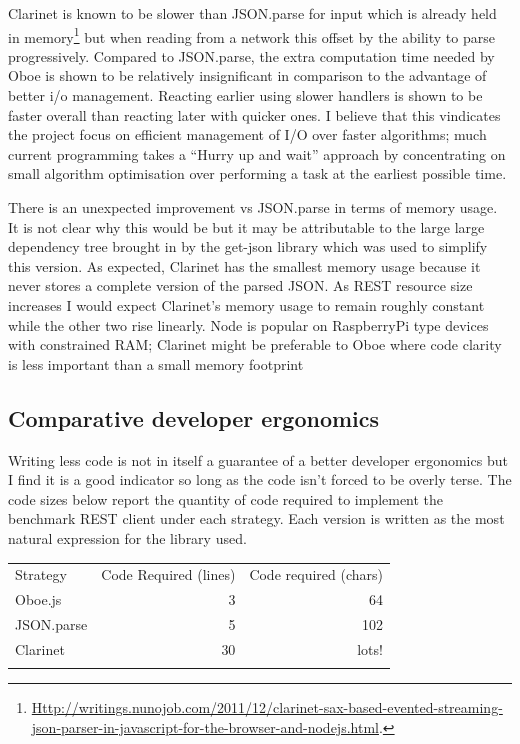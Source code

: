 \documentclass[]{article}
\begin{document}
Clarinet is known to be slower than JSON.parse for input which is
already held in memory\footnote{\href{http://writings.nunojob.com/2011/12/clarinet-sax-based-evented-streaming-json-parser-in-javascript-for-the-browser-and-nodejs.html}{Http://writings.nunojob.com/2011/12/clarinet-sax-based-evented-streaming-json-parser-in-javascript-for-the-browser-and-nodejs.html}.}
but when reading from a network this offset by the ability to parse
progressively. Compared to JSON.parse, the extra computation time needed
by Oboe is shown to be relatively insignificant in comparison to the
advantage of better i/o management. Reacting earlier using slower
handlers is shown to be faster overall than reacting later with quicker
ones. I believe that this vindicates the project focus on efficient
management of I/O over faster algorithms; much current programming takes
a ``Hurry up and wait'' approach by concentrating on small algorithm
optimisation over performing a task at the earliest possible time.

There is an unexpected improvement vs JSON.parse in terms of memory
usage. It is not clear why this would be but it may be attributable to
the large large dependency tree brought in by the get-json library which
was used to simplify this version. As expected, Clarinet has the
smallest memory usage because it never stores a complete version of the
parsed JSON. As REST resource size increases I would expect Clarinet's
memory usage to remain roughly constant while the other two rise
linearly. Node is popular on RaspberryPi type devices with constrained
RAM; Clarinet might be preferable to Oboe where code clarity is less
important than a small memory footprint

\subsection{Comparative developer ergonomics}

Writing less code is not in itself a guarantee of a better developer
ergonomics but I find it is a good indicator so long as the code isn't
forced to be overly terse. The code sizes below report the quantity of
code required to implement the benchmark REST client under each
strategy. Each version is written as the most natural expression for the
library used.

\begin{longtable}[c]{@{}lrr@{}}
\hline\noalign{\medskip}
Strategy & Code Required (lines) & Code required (chars)
\\\noalign{\medskip}
\hline\noalign{\medskip}
Oboe.js & 3 & 64
\\\noalign{\medskip}
JSON.parse & 5 & 102
\\\noalign{\medskip}
Clarinet & 30 & lots!
\\\noalign{\medskip}
\hline
\end{longtable}
\end{document}
